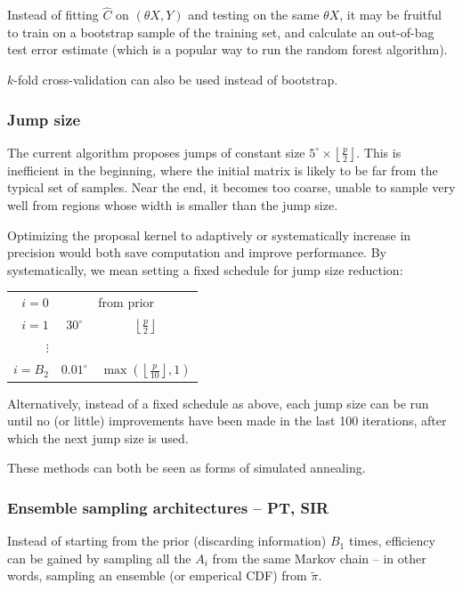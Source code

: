 \documentclass[ejs,preprint]{imsart}
\begin{document}
Instead of fitting $\hat C$ on $(\theta X, Y)$ and testing on the same $\theta X$, it may be fruitful to train on a bootstrap sample of the training set, and calculate an out-of-bag test error estimate (which is a popular way to run the random forest algorithm).

$k$-fold cross-validation can also be used instead of bootstrap.

\subsubsection{Jump size}

The current algorithm proposes jumps of constant size $5^\circ\times\left\lfloor\frac{p}{2}\right\rfloor$. This is inefficient in the beginning, where the initial matrix is likely to be far from the typical set of samples. Near the end, it becomes too coarse, unable to sample very well from regions whose width is smaller than the jump size.

Optimizing the proposal kernel to adaptively or systematically increase in precision would both save computation and improve performance. By systematically, we mean setting a fixed schedule for jump size reduction:

\begin{center}
\begin{tabular}{r|cc}
$i=0$ & \multicolumn{2}{c}{from prior} \\
$i=1$ & $30^\circ$ & $\left\lfloor\frac{p}{2}\right\rfloor$ \\
$\vdots$ & & \\
$i=B_2$ & $0.01^\circ$ & $\max\left(\left\lfloor\frac{p}{10}\right\rfloor, 1\right)$
\end{tabular}
\end{center}

Alternatively, instead of a fixed schedule as above, each jump size can be run until no (or little) improvements have been made in the last 100 iterations, after which the next jump size is used.

These methods can both be seen as forms of simulated annealing.

\subsubsection{Ensemble sampling architectures -- PT, SIR}

Instead of starting from the prior (discarding information) $B_1$ times, efficiency can be gained by sampling all the $A_i$ from the same Markov chain -- in other words, sampling an ensemble (or emperical CDF) from $\tilde\pi$.
\end{document}
